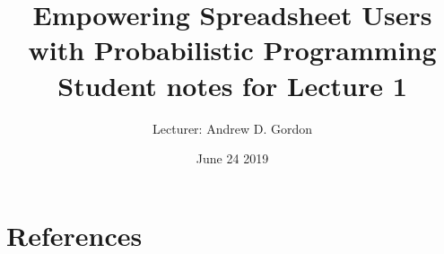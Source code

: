 \documentclass{article}
\title{Empowering Spreadsheet Users \\ with Probabilistic Programming \\[0.2em] {\small Student notes for Lecture 1}}
\author{Lecturer: Andrew D. Gordon}
\date{June 24 2019}
\begin{document}
\maketitle

\tableofcontents













\section{References}

\appendix

{}


\clearpage




\clearpage

\glsaddall
\printglossaries
\end{document}
